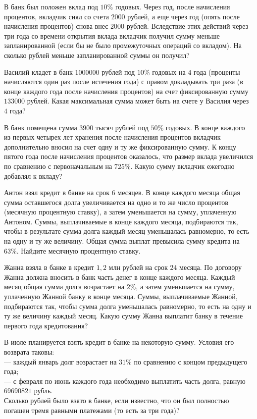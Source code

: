 \begin{class}[number=7]
	\begin{listofex}
		\item В банк был положен вклад под \(10\%\) годовых. Через год, после начисления процентов, вкладчик снял со счета \(2000\) рублей, а еще через год (опять после начисления процентов) снова внес \(2000\) рублей. Вследствие этих действий через три года со времени открытия вклада вкладчик получил сумму меньше запланированной (если бы не было промежуточных операций со вкладом). На сколько рублей меньше запланированной суммы он получил?
		\item Василий кладет в банк \(1 000 000\) рублей под \(10\%\) годовых на \(4\) года (проценты начисляются один раз после истечения года) с правом докладывать три раза (в конце каждого года после начисления процентов) на счет фиксированную сумму \(133 000\) рублей. Какая максимальная сумма может быть на счете у Василия через \(4\) года?
		\item В банк помещена сумма \(3900\) тысяч рублей под \(50\%\) годовых. В конце каждого из первых четырех лет хранения после начисления процентов вкладчик дополнительно вносил на счет одну и ту же фиксированную сумму. К концу пятого года после начисления процентов оказалось, что размер вклада увеличился по сравнению с первоначальным на \(725\%\). Какую сумму вкладчик ежегодно добавлял к вкладу?
		\item Антон взял кредит в банке на срок \(6\) месяцев. В конце каждого месяца общая сумма оставшегося долга увеличивается на одно и то же число процентов (месячную процентную ставку), а затем уменьшается на сумму, уплаченную Антоном. Суммы, выплачиваемые в конце каждого месяца, подбираются так, чтобы в результате сумма долга каждый месяц уменьшалась равномерно, то есть на одну и ту же величину. Общая сумма выплат превысила сумму кредита на \(63\%\). Найдите месячную процентную ставку.
		\item Жанна взяла в банке в кредит \(1,2\) млн рублей на срок \(24\) месяца. По договору Жанна должна вносить в банк часть денег в конце каждого месяца. Каждый месяц общая сумма долга возрастает на \(2\%\), а затем уменьшается на сумму, уплаченную Жанной банку в конце месяца. Суммы, выплачиваемые Жанной, подбираются так, чтобы сумма долга уменьшалась равномерно, то есть на одну и ту же величину каждый месяц. Какую сумму Жанна выплатит банку в течение первого года кредитования?
		\newpage
		\item В июле планируется взять кредит в банке на некоторую сумму. Условия его возврата таковы:\\
		--- каждый январь долг возрастает на \(31\%\) по сравнению с концом предыдущего года;\\
		--- с февраля по июнь каждого года необходимо выплатить часть долга, равную \(69 690 821\) рубль.\\
		Сколько рублей было взято в банке, если известно, что он был полностью погашен тремя равными платежами (то есть за три года)?
	\end{listofex}
\end{class}

